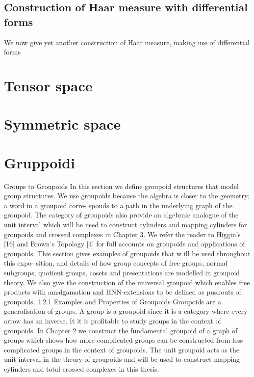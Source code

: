 \documentclass[oneside,12pt]{memoir}
\begin{document}
\section{Construction of Haar measure with differential forms}
We now give yet another construction of Haar measure, making use of differential forms


\chapter{Tensor space}
\PartialToc

\chapter{Symmetric space}
\PartialToc

\chapter{Gruppoidi}
\PartialToc

Groups to Groupoids
In this section we define groupoid structures that model group structures. We use groupoids because the algebra is closer to the geometry; a word in a groupoid corre- sponds to a path in the underlying graph of the groupoid.
The category of groupoids also provide an algebraic analogue of the unit interval which will be used to construct cylinders and mapping cylinders for groupoids and crossed complexes in Chapter 3.
We refer the reader to Higgin’s [16] and Brown’s Topology [4] for full accounts on groupoids and applications of groupoids.
This section gives examples of groupoids that w ill be used throughout this expo- sition, and details of how group concepts of free groups, normal subgroups, quotient groups, cosets and presentations are modelled in groupoid theory. We also give the construction of the universal groupoid which enables free products with amalgamation and HNN-extensions to be defined as pushouts of groupoids.
1.2.1	Examples and Properties of Groupoids
Groupoids are a generalisation of groups. A group is a groupoid since it is a category where every arrow has an inverse. It it is profitable to study groups in the context of groupoids. In Chapter 2 we construct the fundamental groupoid of a graph of groups which shows how more complicated groups can be constructed from less complicated groups in the context of groupoids.
The unit groupoid acts as the unit interval in the theory of groupoids and will be used to construct mapping cylinders and total crossed complexes in this thesis.
\end{document}
